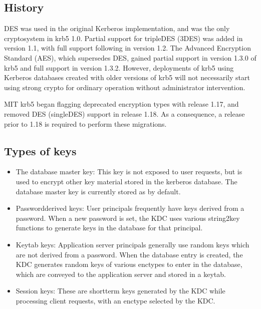 \documentclass[letterpaper,10pt,english]{sphinxmanual}
\begin{document}
\subsection{History}
\label{\detokenize{admin/advanced/retiring-des:history}}
\sphinxAtStartPar
DES was used in the original Kerberos implementation, and was the
only cryptosystem in krb5 1.0.  Partial support for triple\sphinxhyphen{}DES (3DES) was
added in version 1.1, with full support following in version 1.2.
The Advanced Encryption Standard (AES), which supersedes DES, gained
partial support in version 1.3.0 of krb5 and full support in version 1.3.2.
However, deployments of krb5 using Kerberos databases created with older
versions of krb5 will not necessarily start using strong crypto for
ordinary operation without administrator intervention.

\sphinxAtStartPar
MIT krb5 began flagging deprecated encryption types with release 1.17,
and removed DES (single\sphinxhyphen{}DES) support in release 1.18.  As a
consequence, a release prior to 1.18 is required to perform these
migrations.


\subsection{Types of keys}
\label{\detokenize{admin/advanced/retiring-des:types-of-keys}}\begin{itemize}
\item {} 
\sphinxAtStartPar
The database master key:  This key is not exposed to user requests,
but is used to encrypt other key material stored in the kerberos
database.  The database master key is currently stored as 
by default.

\item {} 
\sphinxAtStartPar
Password\sphinxhyphen{}derived keys:  User principals frequently have keys
derived from a password.  When a new password is set, the KDC
uses various string2key functions to generate keys in the database
for that principal.

\item {} 
\sphinxAtStartPar
Keytab keys:  Application server principals generally use random
keys which are not derived from a password.  When the database
entry is created, the KDC generates random keys of various enctypes
to enter in the database, which are conveyed to the application server
and stored in a keytab.

\item {} 
\sphinxAtStartPar
Session keys:  These are short\sphinxhyphen{}term keys generated by the KDC while
processing client requests, with an enctype selected by the KDC.

\end{itemize}
\end{document}
